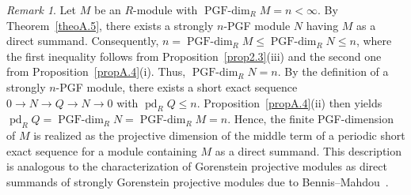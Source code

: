 \documentclass[12pt]{amsart}
\theoremstyle{remark}
\newtheorem{remark}[theorem]{Remark}
\theoremstyle{definition}
\theoremstyle{plain}
\DeclareMathOperator{\pd}{pd}
\newcommand{\PGFdim}{\operatorname{PGF\text{-}dim}}
\begin{document}

\begin{remark}
Let $M$ be an $R$-module with
$\PGFdim_RM=n<\infty$.
By Theorem~\ref{theoA.5}, there exists a strongly $n$-PGF module
$N$ having $M$ as a direct summand. Consequently,
$n=\PGFdim_RM
\leq \PGFdim_RN
\leq n$,
where the first inequality follows from Proposition~\ref{prop2.3}(iii)
and the second one from
Proposition~\ref{propA.4}(i). Thus, $\PGFdim_RN=n$. By the definition of a strongly $n$-PGF module,
there exists a short exact sequence
$0\rightarrow N\rightarrow Q\rightarrow N
\rightarrow 0$
with $\pd_RQ\leq n$.
Proposition~\ref{propA.4}(ii) then yields
$\pd_RQ=\PGFdim_RN=\PGFdim_RM=n$.
Hence, the finite PGF-dimension of $M$ is realized
as the projective dimension of the middle term
of a periodic short exact sequence for a module
containing $M$ as a direct summand.
This description is analogous to the characterization
of Gorenstein projective modules as direct summands
of strongly Gorenstein projective modules
due to Bennis--Mahdou~\cite{BM}.
\end{remark}



\end{document}
